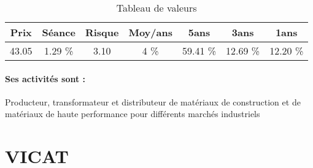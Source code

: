 \documentclass[11pt,a4paper]{report}%
\begin{document}
\begin{table}[H]
  \centering
    \begin{tabular}{|c|c|c|c|c|c|c|}
    \hline
    Prix & Séance & Risque  & Moy/ans & 5ans & 3ans & 1ans \\
    \hline
    43.05 &    1.29 \%    & 3.10 & 4 \% & 59.41 \% & 12.69 \% & 12.20 \% \\
    \hline
    \end{tabular}%
        \label{tab:table_SAINT GOBAIN}%
      \caption{Tableau de valeurs}
\end{table}%

\paragraph{Ses activités sont : } Producteur, transformateur et distributeur de matériaux de construction et de matériaux de haute performance pour différents marchés industriels  
    
    \newpage

\section{VICAT}
\end{document}

